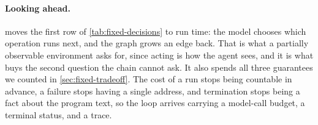 \paragraph{Looking ahead.}
 moves the first row of \cref{tab:fixed-decisions} to run time: the model
chooses which operation runs next, and the graph grows an edge back. That is what a partially
observable environment asks for, since acting is how the agent sees, and it is what buys the
second question the chain cannot ask. It also spends all three guarantees we counted in
\cref{sec:fixed-tradeoff}. The cost of a run stops being countable in advance, a failure stops
having a single address, and termination stops being a fact about the program text, so the loop arrives
carrying a model-call budget, a terminal status, and a trace.
